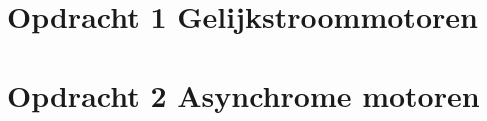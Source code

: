 \documentclass{article}
\begin{document}
\section*{Opdracht 1 Gelijkstroommotoren}


\newpage
\section*{Opdracht 2 Asynchrome motoren}

\end{document}
